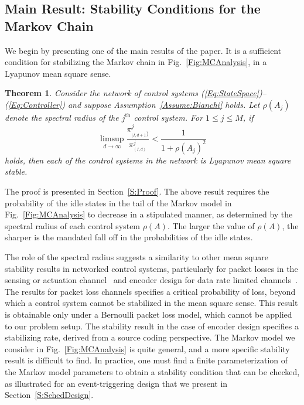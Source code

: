 \documentclass[twocolumn]{autart}
\newtheorem{theorem}{Theorem}[section]
\begin{document}
\subsection{Main Result: Stability Conditions for the Markov Chain}
We begin by presenting one of the main results of the paper. It is a sufficient condition for stabilizing the Markov chain in Fig.~\ref{Fig:MCAnalysis}, in a Lyapunov mean square sense.

\begin{theorem} \label{Thm:SuffGeoSeries}
Consider the network of control systems (\ref{Eq:StateSpace})--(\ref{Eq:Controller}) and suppose Assumption~\ref{Assume:Bianchi} holds. Let $\rho(A_j)$ denote the spectral radius of the $j^{\textrm{th}}$ control system. For $1 \le j \le M$, if
\begin{equation}
\limsup_{d \to \infty} \frac{\pi^{j}_{_{(I,d+1})}}{\pi^{j}_{_{(I,d)}}} < \frac{1}{1+\rho(A_j)^2} \label{Eq:SuffGeoSeries}
\end{equation}
holds, then each of the control systems in the network is Lyapunov mean square stable.
\end{theorem}

The proof is presented in Section~\ref{S:Proof}. The above result requires the probability of the idle states in the tail of the Markov model in Fig.~\ref{Fig:MCAnalysis} to decrease in a stipulated manner, as determined by the spectral radius of each control system $\rho(A)$. The larger the value of $\rho(A)$, the sharper is the mandated fall off in the probabilities of the idle states.

The role of the spectral radius suggests a similarity to other mean square stability results in networked control systems, particularly for packet losses in the sensing or actuation channel~\cite{Gupta2010,Kar2012} and encoder design for data rate limited channels~\cite{Nair2004,Tatikonda2004a,Tatikonda2004b}. The results for packet loss channels specifies a critical probability of loss, beyond which a control system cannot be stabilized in the mean square sense. This result is obtainable only under a Bernoulli packet loss model, which cannot be applied to our problem setup. The stability result in the case of encoder design specifies a stabilizing rate, derived from a source coding perspective. The Markov model we consider in Fig.~\ref{Fig:MCAnalysis} is quite general, and a more specific stability result is difficult to find. In practice, one must find a finite parameterization of the Markov model parameters to obtain a stability condition that can be checked, as illustrated for an event-triggering design that we present in Section~\ref{S:SchedDesign}.
\end{document}

